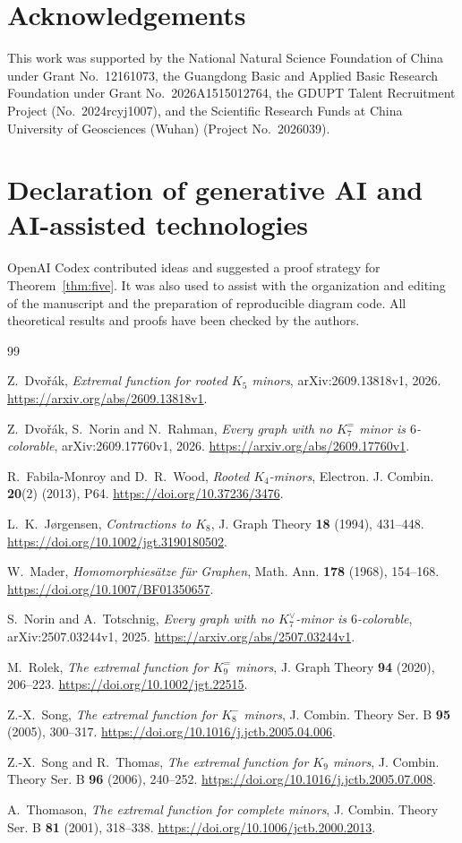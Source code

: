 \documentclass[11pt]{article}
\theoremstyle{remark}
\numberwithin{equation}{section}
\newcommand{\Ke}{K_7^{=}}
\begin{document}
\section*{Acknowledgements}
This work was supported by the National Natural Science Foundation of China under Grant No.~12161073, the Guangdong Basic and Applied Basic Research Foundation under Grant No.~2026A1515012764, the GDUPT Talent Recruitment Project (No.~2024rcyj1007), and the Scientific Research Funds at China University of Geosciences (Wuhan) (Project No.~2026039).

\section*{Declaration of generative AI and AI-assisted technologies}
OpenAI Codex contributed ideas and suggested a proof strategy for Theorem~\ref{thm:five}. It was also used to assist with the organization and editing of the manuscript and the preparation of reproducible diagram code. All theoretical results and proofs have been checked by the authors.

\begin{thebibliography}{99}
\raggedright
{}
Z.~Dvo\v r\'ak,
\emph{Extremal function for rooted $K_5$ minors},
arXiv:2609.13818v1, 2026.
\url{https://arxiv.org/abs/2609.13818v1}.

Z.~Dvo\v r\'ak, S.~Norin and N.~Rahman,
\emph{Every graph with no $\Ke$ minor is $6$-colorable},
arXiv:2609.17760v1, 2026.
\url{https://arxiv.org/abs/2609.17760v1}.

R.~Fabila-Monroy and D.~R.~Wood,
\emph{Rooted $K_4$-minors},
Electron. J. Combin. \textbf{20}(2) (2013), P64.
\url{https://doi.org/10.37236/3476}.

L.~K.~J{\o}rgensen,
\emph{Contractions to $K_8$},
J. Graph Theory \textbf{18} (1994), 431--448.
\url{https://doi.org/10.1002/jgt.3190180502}.

W.~Mader,
\emph{Homomorphies\"atze f\"ur Graphen},
Math. Ann. \textbf{178} (1968), 154--168.
\url{https://doi.org/10.1007/BF01350657}.

S.~Norin and A.~Totschnig,
\emph{Every graph with no $K_7^{\vee}$-minor is $6$-colorable},
arXiv:2507.03244v1, 2025.
\url{https://arxiv.org/abs/2507.03244v1}.

M.~Rolek,
\emph{The extremal function for $K_9^{=}$ minors},
J. Graph Theory \textbf{94} (2020), 206--223.
\url{https://doi.org/10.1002/jgt.22515}.

Z.-X.~Song,
\emph{The extremal function for $K_8^-$ minors},
J. Combin. Theory Ser. B \textbf{95} (2005), 300--317.
\url{https://doi.org/10.1016/j.jctb.2005.04.006}.

Z.-X.~Song and R.~Thomas,
\emph{The extremal function for $K_9$ minors},
J. Combin. Theory Ser. B \textbf{96} (2006), 240--252.
\url{https://doi.org/10.1016/j.jctb.2005.07.008}.

A.~Thomason,
\emph{The extremal function for complete minors},
J. Combin. Theory Ser. B \textbf{81} (2001), 318--338.
\url{https://doi.org/10.1006/jctb.2000.2013}.
\end{thebibliography}
\end{document}
